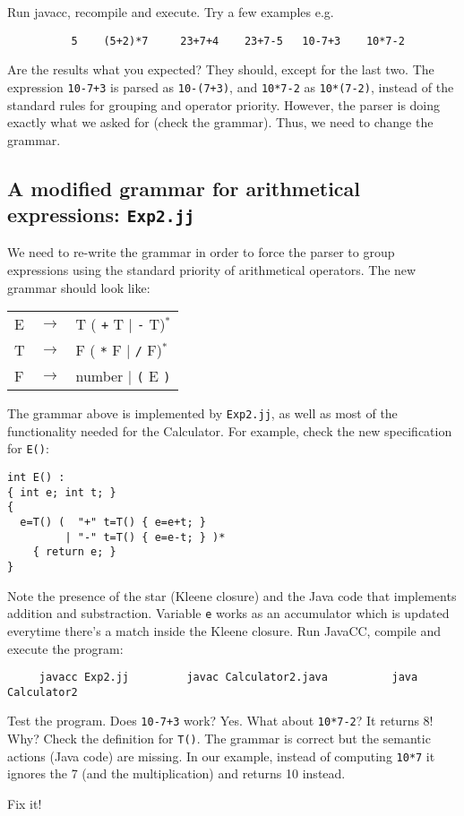 \documentclass{article}
\begin{document}
Run javacc, recompile and execute. Try a few examples e.g.

\begin{verbatim}
          5    (5+2)*7     23+7+4    23+7-5   10-7+3    10*7-2 
\end{verbatim}

Are the results what you expected? They should, except for the last two. The expression {\tt 10-7+3} is parsed as {\tt 10-(7+3)}, and {\tt 10*7-2} as {\tt 10*(7-2)}, instead of the standard rules for grouping and operator priority. However, the parser is doing exactly what we asked for (check the grammar). Thus, we need to change the grammar.


\subsection*{A modified grammar for arithmetical expressions: {\tt Exp2.jj}}

We need to re-write the grammar in order to force the parser to group expressions using the standard priority of arithmetical operators. The new grammar should look like:

\begin{tabular}{lcl}
E & $\rightarrow$ & T ( \verb-+- T $|$ \verb+-+ T)$^*$ \\
T & $\rightarrow$ & F ( \verb+*+ F $|$ \verb+/+ F)$^*$ \\
F & $\rightarrow$ & number $|$ \verb+(+ E \verb+)+\\
\end{tabular}

The grammar above is implemented by {\tt Exp2.jj}, as well as most of the functionality needed for the Calculator. For example, check the new specification for {\tt E()}:

\begin{verbatim}
int E() :
{ int e; int t; }
{
  e=T() (  "+" t=T() { e=e+t; }
         | "-" t=T() { e=e-t; } )*
    { return e; }
}
\end{verbatim}

Note the presence of the star (Kleene closure) and the Java code that implements addition and substraction. Variable {\tt e} works as an accumulator which is updated everytime there's a match inside the Kleene closure. Run JavaCC, compile and execute the program:
\begin{verbatim}
     javacc Exp2.jj         javac Calculator2.java          java Calculator2
\end{verbatim}

Test the program. Does {\tt 10-7+3} work? Yes. What about {\tt 10*7-2}? It returns 8! Why? 
Check the definition for {\tt T()}. The grammar is correct but the semantic actions (Java code) are missing. In our example, instead of computing {\tt 10*7} it ignores the 7 (and the multiplication) and returns 10 instead.

Fix it!
\end{document}
